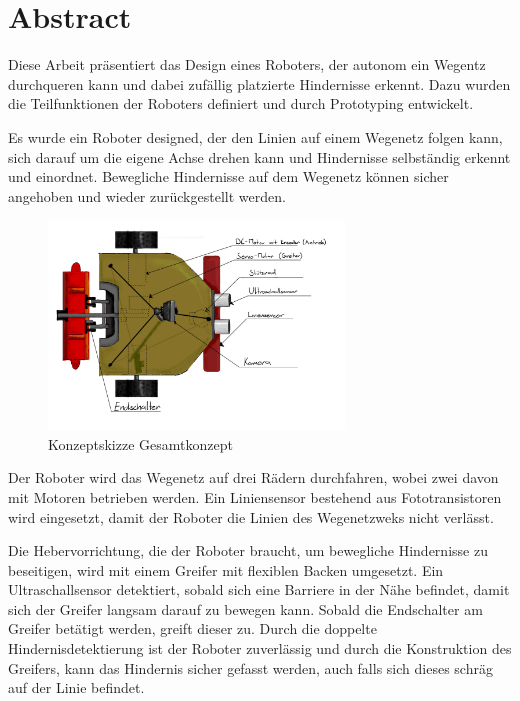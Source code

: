 \section*{Abstract}

Diese Arbeit präsentiert das Design eines Roboters, der autonom ein Wegentz durchqueren kann und dabei zufällig platzierte Hindernisse erkennt. Dazu wurden die Teilfunktionen der Roboters definiert und durch Prototyping entwickelt.

Es wurde ein Roboter designed, der den Linien auf einem Wegenetz folgen kann, sich darauf um die eigene Achse drehen kann und Hindernisse selbständig erkennt und einordnet. Bewegliche Hindernisse auf dem Wegenetz können sicher angehoben und wieder zurückgestellt werden.

\begin{figure}[H]
\centering
\includegraphics[width=0.7\textwidth]{assets/gesamtkonzept/Skizze-Fahrzeugkonzept-Beschriftet.jpg}
\caption{Konzeptskizze Gesamtkonzept}
\label{fig:robot_concept-scetch_labeld-abstract}
\end{figure}

Der Roboter wird das Wegenetz auf drei Rädern durchfahren, wobei zwei davon mit Motoren betrieben werden. Ein Liniensensor bestehend aus Fototransistoren wird eingesetzt, damit der Roboter die Linien des Wegenetzweks nicht verlässt.

Die Hebervorrichtung, die der Roboter braucht, um bewegliche Hindernisse zu beseitigen, wird mit einem Greifer mit flexiblen Backen umgesetzt. Ein Ultraschallsensor detektiert, sobald sich eine Barriere in der Nähe befindet, damit sich der Greifer langsam darauf zu bewegen kann. Sobald die Endschalter am Greifer betätigt werden, greift dieser zu. Durch die doppelte Hindernisdetektierung ist der Roboter zuverlässig und durch die Konstruktion des Greifers, kann das Hindernis sicher gefasst werden, auch falls sich dieses schräg auf der Linie befindet.


